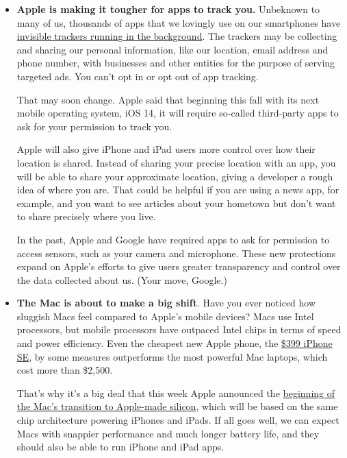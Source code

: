 \begin{itemize}
\item
  \textbf{Apple is making it tougher for apps to track you.} Unbeknown
  to many of us, thousands of apps that we lovingly use on our
  smartphones have
  \href{https://www.nytimes3xbfgragh.onion/2019/07/03/technology/personaltech/fingerprinting-track-devices-what-to-do.html}{invisible
  trackers running in the background}. The trackers may be collecting
  and sharing our personal information, like our location, email address
  and phone number, with businesses and other entities for the purpose
  of serving targeted ads. You can't opt in or opt out of app tracking.

  That may soon change. Apple said that beginning this fall with its
  next mobile operating system, iOS 14, it will require so-called
  third-party apps to ask for your permission to track you.

  Apple will also give iPhone and iPad users more control over how their
  location is shared. Instead of sharing your precise location with an
  app, you will be able to share your approximate location, giving a
  developer a rough idea of where you are. That could be helpful if you
  are using a news app, for example, and you want to see articles about
  your hometown but don't want to share precisely where you live.

  In the past, Apple and Google have required apps to ask for permission
  to access sensors, such as your camera and microphone. These new
  protections expand on Apple's efforts to give users greater
  transparency and control over the data collected about us. (Your move,
  Google.)
\item
  \textbf{The Mac is about to make a big shift}. Have you ever noticed
  how sluggish Macs feel compared to Apple's mobile devices? Macs use
  Intel processors, but mobile processors have outpaced Intel chips in
  terms of speed and power efficiency. Even the cheapest new Apple
  phone, the
  \href{https://www.nytimes3xbfgragh.onion/2020/05/06/technology/personaltech/apple-iphone-se-review.html}{\$399
  iPhone SE}, by some measures outperforms the most powerful Mac
  laptops, which cost more than \$2,500.

  That's why it's a big deal that this week Apple announced the
  \href{https://www.nytimes3xbfgragh.onion/2020/06/19/technology/apple-intel-breakup.html}{beginning
  of the Mac's transition to Apple-made silicon}, which will be based on
  the same chip architecture powering iPhones and iPads. If all goes
  well, we can expect Macs with snappier performance and much longer
  battery life, and they should also be able to run iPhone and iPad
  apps.


\end{itemize}
